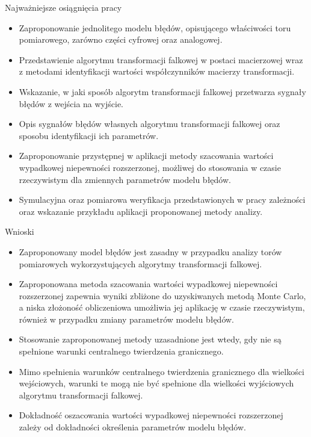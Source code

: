 \documentclass[12pt, polish, aspectratio = 169]{slides}
\begin{document}

\begin{frame}{Najważniejsze osiągnięcia pracy}
\begin{itemize}
\item Zaproponowanie jednolitego modelu błędów, opisującego właściwości toru pomiarowego, zarówno części cyfrowej oraz analogowej.
\item Przedstawienie algorytmu transformacji falkowej w postaci macierzowej wraz z metodami identyfikacji wartości współczynników macierzy transformacji.
\item Wskazanie, w jaki sposób algorytm transformacji falkowej przetwarza sygnały błędów z wejścia na wyjście.
\item Opis sygnałów błędów własnych algorytmu transformacji falkowej oraz sposobu identyfikacji ich parametrów.
\item Zaproponowanie przystępnej w aplikacji metody szacowania wartości wypadkowej niepewności rozszerzonej, możliwej do stosowania w czasie rzeczywistym dla zmiennych parametrów modelu błędów.
\item Symulacyjna oraz pomiarowa weryfikacja przedstawionych w pracy zależności oraz wskazanie przykładu aplikacji proponowanej metody analizy.
\end{itemize}
\end{frame}

\begin{frame}{Wnioski}
\begin{itemize}
\item Zaproponowany model błędów jest zasadny w przypadku analizy torów pomiarowych wykorzystujących algorytmy transformacji falkowej.
\item Zaproponowana metoda szacowania wartości wypadkowej niepewności rozszerzonej zapewnia wyniki zbliżone do uzyskiwanych metodą Monte Carlo, a niska złożoność obliczeniowa umożliwia jej aplikację w czasie rzeczywistym, również w przypadku zmiany parametrów modelu błędów.
\item Stosowanie zaproponowanej metody uzasadnione jest wtedy, gdy nie są spełnione warunki centralnego twierdzenia granicznego.
\item Mimo spełnienia warunków centralnego twierdzenia granicznego dla wielkości wejściowych, warunki te mogą nie być spełnione dla wielkości wyjściowych algorytmu transformacji falkowej.
\item Dokładność oszacowania wartości wypadkowej niepewności rozszerzonej zależy od dokładności określenia parametrów modelu błędów.
\end{itemize}
\end{frame}
\end{document}
